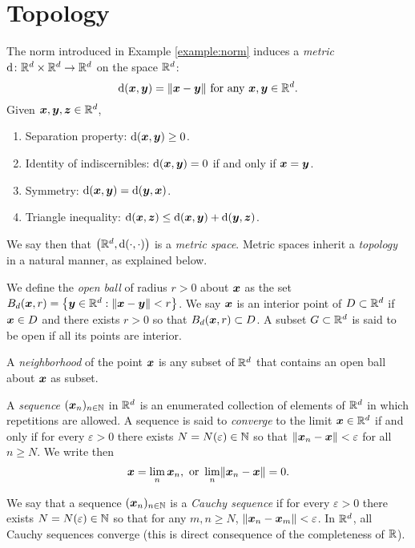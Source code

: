 \section{Topology}
The norm introduced in Example \ref{example:norm} induces a \emph{metric} $\operatorname{d} \colon \mathbb{R}^d \times \mathbb{R}^d \to \mathbb{R}^d$ on the space $\mathbb{R}^d$: 
\begin{equation*}
\operatorname{d}(\boldsymbol{x},\boldsymbol{y}) = \lVert \boldsymbol{x} - \boldsymbol{y} \rVert \text{ for any }\boldsymbol{x}, \boldsymbol{y} \in \mathbb{R}^d.
\end{equation*}
Given $\boldsymbol{x}, \boldsymbol{y}, \boldsymbol{z} \in \mathbb{R}^d$,
\begin{enumerate}
	\item Separation property: $\operatorname{d}(\boldsymbol{x},\boldsymbol{y}) \geq 0$.
	\item Identity of indiscernibles: $\operatorname{d}(\boldsymbol{x}, \boldsymbol{y}) = 0$ if and only if $\boldsymbol{x} = \boldsymbol{y}$.
	\item Symmetry: $\operatorname{d}(\boldsymbol{x}, \boldsymbol{y}) = \operatorname{d}(\boldsymbol{y}, \boldsymbol{x})$.
	\item Triangle inequality: $\operatorname{d}(\boldsymbol{x},\boldsymbol{z}) \leq \operatorname{d}(\boldsymbol{x},\boldsymbol{y}) + \operatorname{d}(\boldsymbol{y},\boldsymbol{z})$. 
\end{enumerate}
We say then that $\big( \mathbb{R}^d, \operatorname{d}(\cdot,\cdot) \big)$ is a \emph{metric space}.  Metric spaces inherit a \emph{topology} in a natural manner, as explained below.

We define the \emph{open ball} of radius $r>0$ about $\boldsymbol{x}$ as the set $B_d(\boldsymbol{x},r) = \big\{ \boldsymbol{y} \in \mathbb{R}^d : \lVert \boldsymbol{x}- \boldsymbol{y} \rVert < r \big\}$.  We say $\boldsymbol{x}$ is an interior point of $D \subset \mathbb{R}^d$ if $\boldsymbol{x} \in D$ and there exists $r>0$ so that $B_d(\boldsymbol{x}, r) \subset D$.  A subset $G \subset \mathbb{R}^d$ is said to be open if all its points are interior.

A \emph{neighborhood} of the point $\boldsymbol{x}$ is any subset of $\mathbb{R}^d$ that contains an open ball about $\boldsymbol{x}$ as subset. 

A \emph{sequence} $({\boldsymbol{x}}_{n})_{{n}\in\mathbb{N}}$ in $\mathbb{R}^d$ is an enumerated collection of elements of $\mathbb{R}^d$ in which repetitions are allowed.  A sequence is said to \emph{converge} to the limit $\boldsymbol{x} \in \mathbb{R}^d$ if and only if for every $\varepsilon>0$ there exists $N=N(\varepsilon) \in \mathbb{N}$ so that $\lVert \boldsymbol{x}_n - \boldsymbol{x} \rVert < \varepsilon$ for all $n \geq N$.  We write then 
\begin{equation*}
\boldsymbol{x} = \lim_n \boldsymbol{x}_n, \text{ or } \lim_n \lVert \boldsymbol{x}_n - \boldsymbol{x} \rVert = 0.
\end{equation*}

We say that a sequence $({\boldsymbol{x}}_{n})_{{n}\in\mathbb{N}}$ is a \emph{Cauchy sequence} if for every $\varepsilon>0$ there exists $N = N(\varepsilon) \in \mathbb{N}$ so that for any $m,n \geq N$, $\lVert \boldsymbol{x}_n - \boldsymbol{x}_m \rVert < \varepsilon$.  In $\mathbb{R}^d$, all Cauchy sequences converge (this is direct consequence of the completeness of $\mathbb{R}$).

